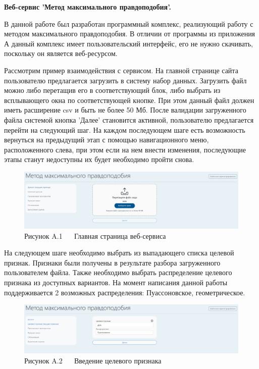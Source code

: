 \textbf{Веб-сервис 'Метод максимального правдоподобия'.}


В данной работе был разработан программный комплекс, реализующий работу с методом максимального правдоподобия. В отличии от программы из приложения А данный комплекс имеет пользовательский интерфейс, его не нужно скачивать, поскольку он является веб-ресурсом.

Рассмотрим пример взаимодействия с сервисом. На главной странице сайта пользователю предлагается загрузить в систему набор данных. Загрузить файл можно либо перетащив его в соответствующий блок, либо выбрать из всплывающего окна по соответствующей кнопке. При этом данный файл должен иметь расширение csv и быть не более 50 Мб. После валидации загруженного файла системой кнопка 'Далее' становится активной, пользователю предлагается перейти на следующий шаг. На каждом последующем шаге есть возможность вернуться на предыдущий этап с помощью навигационного меню, расположенного слева, при этом если на нем внести изменения, последующие этапы станут недоступны их будет необходимо пройти снова.

\begin{figure}[H]
    \begin{center}
        \includegraphics[width=1.0\linewidth]{src/img/screens/1.jpg}
        \caption*{Рисунок A.1 ~~ Главная страница веб-сервиса}
        \label{fig:screen_1}
    \end{center}
\end{figure}

На следующем шаге необходимо выбрать из выпадающего списка целевой признак. Признаки были получены в результате разбора загруженного пользователем файла. Также необходимо выбрать распределение целевого признака из доступных вариантов. На момент написания данной работы поддерживается 2 возможных распределения: Пуассоновское, геометрическое.

\begin{figure}[H]
    \begin{center}
        \includegraphics[width=1.0\linewidth]{src/img/screens/2.jpg}
        \caption*{Рисунок A.2 ~~ Введение целевого признака}
        \label{fig:screen_2}
    \end{center}
\end{figure}

